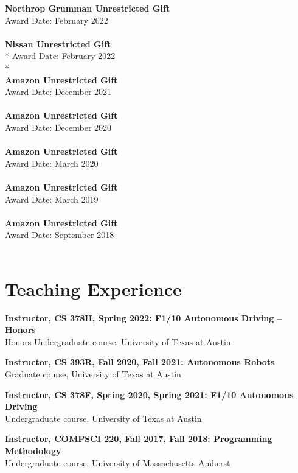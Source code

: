 \documentclass[Times]{article}
\newcommand{\funding}[1]{#1\\}
\renewcommand{\funding}[1]{\\}
\begin{document}
\textbf{Northrop Grumman Unrestricted Gift}\\
Award Date: February 2022\\
\funding{Amount: \$75,000.}

\clearpage
\textbf{Nissan Unrestricted Gift}\\*
Award Date: February 2022\\*
\funding{Amount: \$49,000.}

\textbf{Amazon Unrestricted Gift}\\
Award Date: December 2021\\
\funding{Amount: \$70,000.}

\textbf{Amazon Unrestricted Gift}\\
Award Date: December 2020\\
\funding{Amount: \$80,000.}

\textbf{Amazon Unrestricted Gift}\\
Award Date: March 2020\\
\funding{Amount: \$80,000.}

\textbf{Amazon Unrestricted Gift}\\
Award Date: March 2019\\
\funding{Amount: \$40,000.}

\textbf{Amazon Unrestricted Gift}\\
Award Date: September 2018\\
\funding{Amount: \$40,000.}

\section*{Teaching Experience}

\setlength{\parskip}{1em}
{\bf Instructor, CS 378H, Spring 2022: F1/10 Autonomous Driving -- Honors}\\
Honors Undergraduate course, University of Texas at Austin

{\bf Instructor, CS 393R, Fall 2020, Fall 2021: Autonomous Robots}\\
Graduate course, University of Texas at Austin

{\bf Instructor, CS 378F, Spring 2020, Spring 2021: F1/10 Autonomous Driving}\\
Undergraduate course, University of Texas at Austin

{\bf Instructor, COMPSCI 220, Fall 2017, Fall 2018: Programming Methodology}\\
Undergraduate course, University of Massachusetts Amherst
\end{document}
